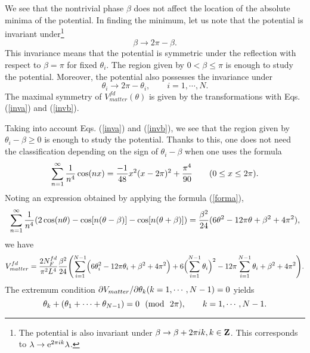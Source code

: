 \documentclass[a4paper,12pt]{article}
\begin{document}
We see that the nontrivial phase $\beta$ does not affect the
location of the absolute minima of the potential. In finding the
minimum, let us note that the potential is invariant 
under\footnote{The potential is also invariant 
under $\beta\rightarrow \beta + 2\pi i k, k\in {\bf Z}$. 
This corresponds to $\lambda\rightarrow {\rm e}^{2\pi i k}\lambda$.}
\begin{equation}
\beta\rightarrow 2\pi -\beta.
\label{inva}
\end{equation}
This invariance means that the potential is symmetric 
under the reflection with respect to $\beta=\pi$
for fixed $\theta_i$. 
The region given by $0<\beta \leq \pi$ is enough to
study the potential. Moreover, the potential also possesses
the invariance under
\begin{equation}
\theta_i\rightarrow 2\pi-\theta_i,\qquad i=1, \cdots, N.
\label{invb}
\end{equation}
The maximal symmetry of $V_{matter}^{fd}(\theta)$ is given by the 
transformations with Eqs. (\ref{inva}) and (\ref{invb}).
\par
Taking into account Eqs. (\ref{inva}) and (\ref{invb}), we see that the 
region given by $\theta_i-\beta \geq 0$ is enough to study the
potential. Thanks to this, one does not need the classification
depending on the sign of $\theta_i-\beta$ when one uses the formula
\begin{equation}
\sum_{n=1}^{\infty}{1\over{n^4}}\cos(nx)={{-1}\over{48}}x^2(x-2\pi)^2+
{{\pi^4}\over{90}} \qquad (0\leq x\leq 2\pi).
\label{forma}
\end{equation}
Noting an expression obtained by applying the formula (\ref{forma}),  
\begin{equation}
\sum_{n=1}^{\infty}{1\over n^4}(2\cos(n\theta)-\cos[n(\theta-\beta)]-
\cos[n(\theta+\beta)])
={{\beta^2}\over {24}}(6\theta^2-12\pi\theta + \beta^2 +4\pi^2),
\label{formb}
\end{equation}
we have
\begin{equation}
V_{matter}^{fd}={{2N_F^{fd}}\over {\pi^2 L^4}}{\beta^2\over {24}}
\Biggl(\sum_{i=1}^{N-1}\Bigl(6\theta_i^2 -12\pi\theta_i +\beta^2+4\pi^2\Bigr)
+6\Bigl(\sum_{i=1}^{N-1}\theta_i\Bigr)^2-12\pi\sum_{i=1}^{N-1}\theta_i
+\beta^2+4\pi^2\Biggr).
\end{equation}
The extremum condition $\partial V_{matter}/\partial\theta_k (k=1,\cdots, N-1)=0$ 
yields
\begin{equation}
\theta_k+(\theta_1+\cdots +\theta_{N-1})=0~~({\rm mod}~~2\pi), 
\qquad k=1,\cdots, N-1.
\label{equation}
\end{equation}
\end{document}
